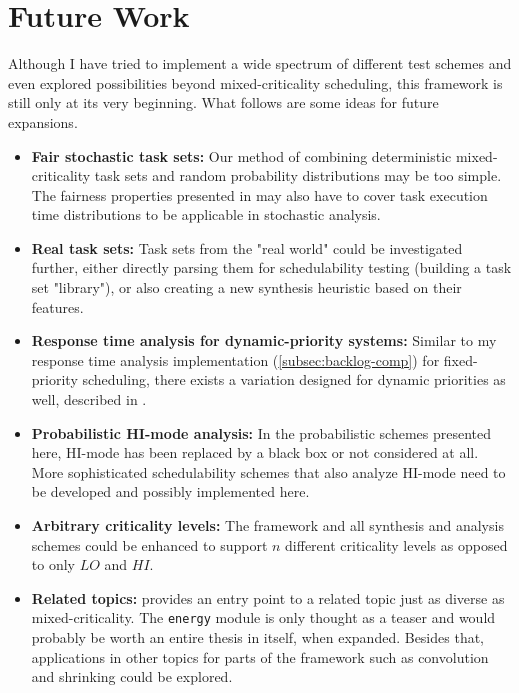 \documentclass[a4paper,oneside]{csthesis}
\begin{document}
\section{Future Work}
Although I have tried to implement a wide spectrum of different test schemes and even explored possibilities beyond mixed-criticality scheduling, this framework is still only at its very beginning. What follows are some ideas for future expansions.
\begin{itemize}
    \item \textbf{Fair stochastic task sets:} Our method of combining deterministic mixed-criticality task sets and random probability distributions may be too simple. The fairness properties presented in \cite{ramanathan2016evaluation} may also have to cover task execution time distributions to be applicable in stochastic analysis.
    \item \textbf{Real task sets:} Task sets from the "real world" could be investigated further, either directly parsing them for schedulability testing (building a task set "library"), or also creating a new synthesis heuristic based on their features.
    \item \textbf{Response time analysis for dynamic-priority systems:} Similar to my response time analysis implementation (\cref{subsec:backlog-comp}) for fixed-priority scheduling, there exists a variation designed for dynamic priorities as well, described in \cite{diaz2002probabilistic}. 
    \item \textbf{Probabilistic HI-mode analysis:} In the probabilistic schemes presented here, HI-mode has been replaced by a black box or not considered at all. More sophisticated schedulability schemes that also analyze HI-mode need to be developed and possibly implemented here.
    \item \textbf{Arbitrary criticality levels:} The framework and all synthesis and analysis schemes could be enhanced to support $n$ different criticality levels as opposed to only $LO$ and $HI$.
    \item \textbf{Related topics:}  provides an entry point to a related topic just as diverse as mixed-criticality. The \texttt{energy} module is only thought as a teaser and would probably be worth an entire thesis in itself, when expanded. Besides that, applications in other topics for parts of the framework such as convolution and shrinking could be explored.
\end{itemize}


 
\end{document}
